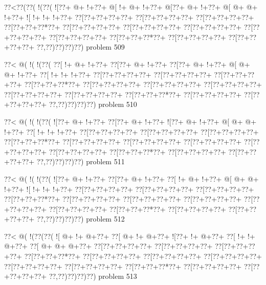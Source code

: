 \vbox{\vbox{\goo
\0??<\0??(\0??(\- !(\0??(
\- ![\0??+\- @+\- !+\0??+
\- @[\- !+\- @+\- !+\0??+
\- @[\0??+\- @+\- !+\0??+
\- @[\- @+\- @+\- !+\0??+
\- ![\- !+\- !+\- !+\0??+
\0??[\0??+\0??+\0??+\0??+
\0??[\0??+\0??+\0??+\0??+
\0??[\0??+\0??+\0??+\0??+
\0??[\0??+\0??+\0??*\0??+
\0??[\0??+\0??+\0??+\0??+
\0??[\0??+\0??+\0??+\0??+
\0??[\0??+\0??+\0??+\0??+
\0??[\0??+\0??+\0??+\0??+
\0??[\0??+\0??+\0??+\0??+
\0??[\0??+\0??+\0??*\0??+
\0??[\0??+\0??+\0??+\0??+
\0??[\0??+\0??+\0??+\0??+
\0??,\0??)\0??)\0??)\0??)
}
\hfil problem 509\hfil\break
}

\vbox{\vbox{\goo
\0??<\- @(\- !(\- !(\0??(
\0??[\- !+\- @+\- !+\0??+
\0??[\0??+\- @+\- !+\0??+
\0??[\0??+\- @+\- !+\0??+
\- @[\- @+\- @+\- !+\0??+
\0??[\- !+\- !+\- !+\0??+
\0??[\0??+\0??+\0??+\0??+
\0??[\0??+\0??+\0??+\0??+
\0??[\0??+\0??+\0??+\0??+
\0??[\0??+\0??+\0??*\0??+
\0??[\0??+\0??+\0??+\0??+
\0??[\0??+\0??+\0??+\0??+
\0??[\0??+\0??+\0??+\0??+
\0??[\0??+\0??+\0??+\0??+
\0??[\0??+\0??+\0??+\0??+
\0??[\0??+\0??+\0??*\0??+
\0??[\0??+\0??+\0??+\0??+
\0??[\0??+\0??+\0??+\0??+
\0??,\0??)\0??)\0??)\0??)
}
\hfil problem 510\hfil\break
}

\vbox{\vbox{\goo
\0??<\- @(\- !(\- !(\0??(
\- ![\0??+\- @+\- !+\0??+
\0??[\0??+\- @+\- !+\0??+
\- ![\0??+\- @+\- !+\0??+
\- @[\- @+\- @+\- !+\0??+
\0??[\- !+\- !+\- !+\0??+
\0??[\0??+\0??+\0??+\0??+
\0??[\0??+\0??+\0??+\0??+
\0??[\0??+\0??+\0??+\0??+
\0??[\0??+\0??+\0??*\0??+
\0??[\0??+\0??+\0??+\0??+
\0??[\0??+\0??+\0??+\0??+
\0??[\0??+\0??+\0??+\0??+
\0??[\0??+\0??+\0??+\0??+
\0??[\0??+\0??+\0??+\0??+
\0??[\0??+\0??+\0??*\0??+
\0??[\0??+\0??+\0??+\0??+
\0??[\0??+\0??+\0??+\0??+
\0??,\0??)\0??)\0??)\0??)
}
\hfil problem 511\hfil\break
}

\vbox{\vbox{\goo
\0??<\- @(\- !(\- !(\0??(
\- ![\0??+\- @+\- !+\0??+
\0??[\0??+\- @+\- !+\0??+
\0??[\- !+\- @+\- !+\0??+
\- @[\- @+\- @+\- !+\0??+
\- ![\- !+\- !+\- !+\0??+
\0??[\0??+\0??+\0??+\0??+
\0??[\0??+\0??+\0??+\0??+
\0??[\0??+\0??+\0??+\0??+
\0??[\0??+\0??+\0??*\0??+
\0??[\0??+\0??+\0??+\0??+
\0??[\0??+\0??+\0??+\0??+
\0??[\0??+\0??+\0??+\0??+
\0??[\0??+\0??+\0??+\0??+
\0??[\0??+\0??+\0??+\0??+
\0??[\0??+\0??+\0??*\0??+
\0??[\0??+\0??+\0??+\0??+
\0??[\0??+\0??+\0??+\0??+
\0??,\0??)\0??)\0??)\0??)
}
\hfil problem 512\hfil\break
}

\vbox{\vbox{\goo
\0??<\- @(\- !(\0??(\0??(
\- ![\- @+\- !+\- @+\0??+
\0??[\- @+\- !+\- @+\0??+
\- ![\0??+\- !+\- @+\0??+
\0??[\- !+\- !+\- @+\0??+
\0??[\- @+\- @+\- @+\0??+
\0??[\0??+\0??+\0??+\0??+
\0??[\0??+\0??+\0??+\0??+
\0??[\0??+\0??+\0??+\0??+
\0??[\0??+\0??+\0??*\0??+
\0??[\0??+\0??+\0??+\0??+
\0??[\0??+\0??+\0??+\0??+
\0??[\0??+\0??+\0??+\0??+
\0??[\0??+\0??+\0??+\0??+
\0??[\0??+\0??+\0??+\0??+
\0??[\0??+\0??+\0??*\0??+
\0??[\0??+\0??+\0??+\0??+
\0??[\0??+\0??+\0??+\0??+
\0??,\0??)\0??)\0??)\0??)
}
\hfil problem 513\hfil\break
}

